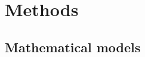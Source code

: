 \documentclass[a4paper,11pt]{article} %
\newcommand{\1}{^{(1)}}
\newcommand{\2}{^{(2)}}
\providecommand{\DIFdelend}{} %
\DeclareRobustCommand{\DIFdelend}{\DIFOaddend \let\includegraphics\DIFOincludegraphics} %
\begin{document}


\DIFdelend \section{Methods}
\label{sec:method}
\subsection{Mathematical models}
\end{document}
